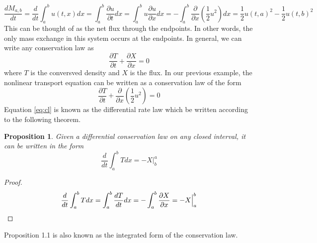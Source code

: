 \documentclass{article}
\newcommand{\pd}[2]{\frac{\partial #1}{\partial #2}}
\newcommand{\od}[2]{\frac{d #1}{d #2}}
\newtheorem{proposition}[theorem]{Proposition}
\numberwithin{equation}{section}
\begin{document}
\begin{equation}
    \od{M_{a,b}}{t} = \frac{d}{dt}\int^b_au(t,x)dx = \int^b_a \pd{u}{t}dx = \int^b_a u\pd{u}{x}dx =-\int^b_a\frac{\partial}{\partial x}(\frac{1}{2}u^2)dx = \frac{1}{2}u(t,a)^2-\frac{1}{2}u(t,b)^2 \label{eq:1.14}
\end{equation}
This can be thought of as the net flux through the endpoints. In other words, the only mass exchange in this system occurs at the endpoints. In general, we can write any conservation law as 
\begin{equation}
    \pd{T}{t} + \pd{X}{x} = 0 \label{eq:cl}
\end{equation}
where $T$ is the conversved density and $X$ is the flux. In our previous example, the nonlinear transport equation can be written as a conservation law of the form
\begin{equation*}
    \pd{T}{t} +\frac{\partial}{\partial x}(\frac{1}{2}u^2)=0
\end{equation*}
Equation \eqref{eq:cl} is known as the differential rate law which be written according to the following theorem.

\begin{proposition}
    Given a differential conservation law on any closed interval, it can be written in the form
    \begin{equation}
        \frac{d}{dt}\int^b_aTdx = -X\Big|^a_b
    \end{equation}
\end{proposition}
\begin{proof} 
\begin{equation*}
    \displaystyle{\frac{d}{dt}\int^b_aTdx = \int^b_a\od{T}{t}dx=-\int^b_a\pd{X}{x}=-X\Big|^b_a}\\
\end{equation*}
\end{proof}
Proposition 1.1 is also known as the integrated form of the conservation law.\\
\end{document}
